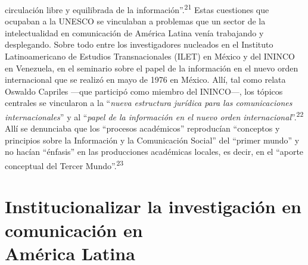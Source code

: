 \documentclass{tufte-handout}
\begin{document}
circulación libre y equilibrada de la información''.\textsuperscript{21} Estas cuestiones que ocupaban a la UNESCO se
vinculaban a problemas que un sector de la intelectualidad en
comunicación de América Latina venía trabajando y desplegando. Sobre
todo entre los investigadores nucleados en el Instituto Latinoamericano
de Estudios Transnacionales (ILET) en México y del ININCO en Venezuela,
en el seminario sobre el papel de la información en el nuevo orden
internacional que se realizó en mayo de 1976 en México. Allí, tal como
relata Oswaldo Capriles ---que participó como miembro del ININCO---, los
tópicos centrales se vincularon a la ``\emph{nueva estructura jurídica
para las comunicaciones internacionales}'' y al ``\emph{papel de la
información en el nuevo orden internacional}''.\textsuperscript{22} Allí se denunciaba que los ``procesos
académicos'' reproducían ``conceptos y principios sobre la Información y
la Comunicación Social'' del ``primer mundo'' y no hacían ``énfasis'' en
las producciones académicas locales, es decir, en el ``aporte conceptual
del Tercer Mundo''.\textsuperscript{23}

\hypertarget{institucionalizar-la-investigacin-en-comunicacin-en-amrica-latina}{%
\section{Institucionalizar la investigación en comunicación en\\\noindent
América
Latina}\label{institucionalizar-la-investigacin-en-comunicacin-en-amrica-latina}}
\end{document}
